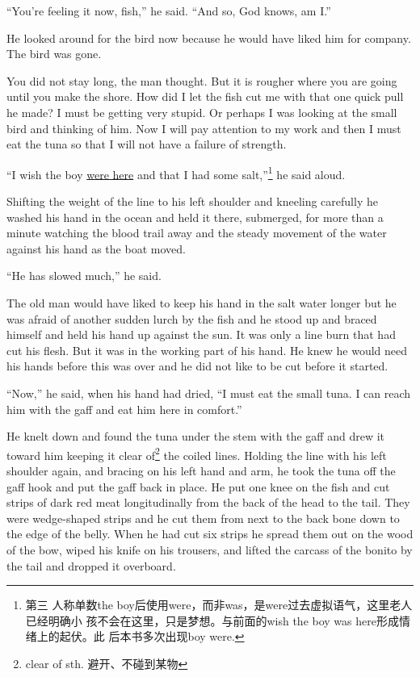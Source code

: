 ``You're feeling it now, fish,'' he said. ``And so, God knows, am I.''

He looked around for the bird now because he would have liked him for
\gls{company}. The bird was gone.

You did not stay long, the man thought. But it is rougher where you are
going until you make the shore. How did I let the fish cut me with that one
quick pull he made? I must be getting very stupid. Or perhaps I was looking
at the small bird and thinking of him. Now I will pay \gls{attention} to my work
and then I must eat the tuna so that I will not have a \gls{failure} of strength.

``I wish the boy \uline{were here} and that I had some salt,''\footnote{第三
  人称单数the boy后使用were，而非was，是were过去虚拟语气，这里老人已经明确小
  孩不会在这里，只是梦想。与前面的wish the boy was here形成情绪上的起伏。此
  后本书多次出现boy were.}
he said aloud.

Shifting the weight of the line to his left shoulder and \gls{kneel}ing
carefully he washed his hand in the ocean and held it there,
\gls{submerged}, for more than a minute watching the blood trail away and
the steady movement of the water against his hand as the boat moved.

``He has slowed much,'' he said.

The old man would have liked to keep his hand in the salt water longer but
he was afraid of another sudden lurch by the fish and he stood up and braced
himself and held his hand up against the sun. It was only a line burn that
had cut his flesh. But it was in the working part of his hand. He knew he
would need his hands before this was over and he did not like to be cut
before it started.

``Now,'' he said, when his hand had dried, ``I must eat the small tuna. I
can reach him with the gaff and eat him here in comfort.''

He knelt down and found the tuna under the stem with the gaff and drew it
toward him keeping it clear of\footnote{clear of sth. 避开、不碰到某物} the
coiled lines. Holding the line with his left shoulder again, and bracing on
his left hand and arm, he took the tuna off the gaff hook and put the gaff
back in place. He put one knee on the fish and cut strips of dark red meat
\gls{longitudinally} from the back of the head to the tail. They were
\gls{wedge-shaped} strips and he cut them from next to the back bone down to the
edge of the belly. When he had cut six strips he spread them out on the wood
of the bow, \gls{wiped} his knife on his trousers, and lifted the \gls{carcass} of the
bonito by the tail and dropped it overboard.

